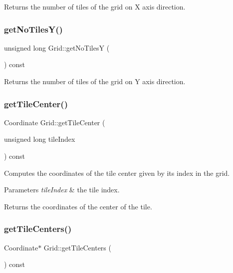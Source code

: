 \begin{DoxyReturn}{Returns}
the number of tiles of the grid on X axis direction. 
\end{DoxyReturn}
\mbox{\label{class_grid_a783a3153d03154cfd33e6a418bb8d390}} 
\subsubsection{\texorpdfstring{get\+No\+Tiles\+Y()}{getNoTilesY()}}
{\footnotesize\ttfamily unsigned long Grid\+::get\+No\+TilesY (\begin{DoxyParamCaption}{ }\end{DoxyParamCaption}) const}

\begin{DoxyReturn}{Returns}
the number of tiles of the grid on Y axis direction. 
\end{DoxyReturn}
\mbox{\label{class_grid_aa8d3de015a2b22d0cd0d72b3e7c29088}} 
\subsubsection{\texorpdfstring{get\+Tile\+Center()}{getTileCenter()}}
{\footnotesize\ttfamily Coordinate Grid\+::get\+Tile\+Center (\begin{DoxyParamCaption}\item[{unsigned long}]{tile\+Index }\end{DoxyParamCaption}) const}

Computes the coordinates of the tile center given by its index in the grid. 
\begin{DoxyParams}{Parameters}
{\em tile\+Index} & the tile index. \\
\hline
\end{DoxyParams}
\begin{DoxyReturn}{Returns}
the coordinates of the center of the tile. 
\end{DoxyReturn}
\mbox{\label{class_grid_aa1b1f4c938207b16694a27cb9beb66eb}} 
\subsubsection{\texorpdfstring{get\+Tile\+Centers()}{getTileCenters()}}
{\footnotesize\ttfamily Coordinate$\ast$ Grid\+::get\+Tile\+Centers (\begin{DoxyParamCaption}{ }\end{DoxyParamCaption}) const}

